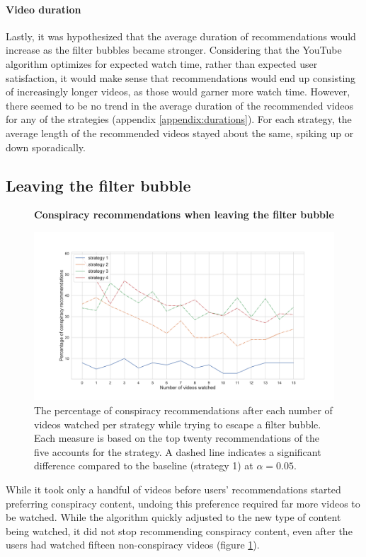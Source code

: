 \documentclass[../main.tex]{subfiles}
\begin{document}
\paragraph{Video duration}
Lastly, it was hypothesized that the average duration of recommendations would increase as the filter bubbles
became stronger. Considering that the YouTube algorithm optimizes for expected watch time, rather than expected
user satisfaction, it would make sense that recommendations would end up consisting of increasingly longer
videos, as those would garner more watch time. However, there seemed to be no trend in the average duration of
the recommended videos for any of the strategies (appendix \ref{appendix:durations}). For each strategy, the
average length of the recommended videos stayed about the same, spiking up or down sporadically.

\subsection{Leaving the filter bubble}

\begin{figure}[t]
  \textbf{Conspiracy recommendations when leaving the filter bubble}\par\medskip
  \centering
  \includegraphics[keepaspectratio, width=\textwidth]{images/conspiracy_recs_2.pdf}
  \caption{The percentage of conspiracy recommendations after each number of videos watched per strategy while trying to escape a filter bubble. Each measure is based on the top twenty recommendations of the five accounts for the strategy. A dashed line indicates a significant difference compared to the baseline (strategy 1) at $\alpha = 0.05$.}
  \label{fig:con_recs_2}
\end{figure}

While it took only a handful of videos before users' recommendations started preferring conspiracy content, 
undoing this preference required far more videos to be watched. While the algorithm quickly adjusted to the 
new type of content being watched, it did not stop recommending conspiracy content, even after the users had
watched fifteen non-conspiracy videos (figure \ref{fig:con_recs_2}). 
\end{document}
